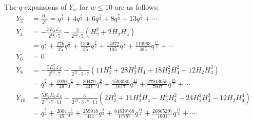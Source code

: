 \documentclass[10pt,reqno]{amsproc}
\newcommand{\cL}{\mathcal{L}}
\newcommand{\1}{\mathds{1}}	%
\theoremstyle{definition}
\theoremstyle{remark}
\begin{document}
The $q$-expansions of $Y_w$ for $w \le 10$ are as follows:
\begin{align*}
    Y_{2} &= \frac{H_{2}}{2^4} = q^{\frac{1}{2}} + 4 q^{\frac{3}{2}} + 6 q^\frac{5}{2} + 8 q^\frac{7}{2} + 13 q^\frac{9}{2} + \cdots \\
    Y_{4} &= -\frac{3 E_4 \cL_S}{2^{11} \cdot 5} -\frac{3}{2^{12} \cdot 5} (H_{2}^{2} + 2 H_{2} H_{4}) \\
    &= q^{\frac{3}{2}} + \frac{276}{25}q^\frac{5}{2} + \frac{1566}{35}q^{\frac{7}{2}} + \frac{14072}{105}q^\frac{9}{2} + \frac{113963}{385}q^\frac{11}{2}+ \cdots \\
    Y_{6} &= 0 \\
    Y_{8} &= -\frac{5 E_4^2 \cL_S}{2^{19} \cdot 7} - \frac{5}{2^{21} \cdot 3 \cdot 7} (11 H_2^4 + 28 H_2^3 H_4 + 18 H_2^2 H_4^2 + 12 H_2 H_4^3) \\
    &= q^\frac{5}{2} + \frac{1020}{49}q^\frac{7}{2} + \frac{80470}{441}q^\frac{9}{2} + \frac{1593080}{1617}q^\frac{11}{2} + \frac{27913055}{7007}q^{\frac{13}{2}} + \cdots \\
    Y_{10} &= \frac{5 E_4 E_6 \cL_S}{2^{17} \cdot 7 \cdot 11} - \frac{5}{2^{19} \cdot 3 \cdot 7 \cdot 11} (2 H_2^5 + 11 H_2^4 H_4 - H_2^3 H_4^2 - 24 H_2^2 H_4^3 - 12 H_2 H_4^4) \\
    &= q^\frac{5}{2} + \frac{2004}{49}q^\frac{7}{2} + \frac{259918}{441}q^\frac{9}{2} + \frac{84839768}{17787}q^\frac{11}{2} + \frac{26865297}{1001}q^\frac{13}{2} + \cdots.
\end{align*}
\end{document}
